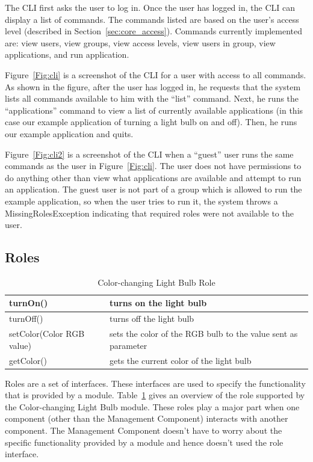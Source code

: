 The CLI first asks the user to log in. Once the user has logged in, the CLI can
display a list of commands. The commands listed are based on the user's access
level (described in Section~\ref{sec:core_access}). Commands currently
implemented are: view users, view groups, view access levels, view users in
group, view applications, and run application.

Figure~\ref{Fig:cli} is a screenshot of the CLI for a user with access to all
commands. As shown in the figure, after the user has logged in, he requests that
the system lists all commands available to him with the ``list'' command. Next,
he runs the ``applications'' command to view a list of currently available
applications (in this case our example application of turning a light bulb on
and off). Then, he runs our example application and quits.

Figure~\ref{Fig:cli2} is a screenshot of the CLI when a ``guest'' user runs the
same commands as the user in Figure~\ref{Fig:cli}. The user does not have
permissions to do anything other than view what applications are available and
attempt to run an application. The guest user is not part of a group which is
allowed to run the example application, so when the user tries to run it, the
system throws a MissingRolesException indicating that required roles were not
available to the user.
\subsection{Roles}
\label{sec:rolesimpl}
\begin{table}
\begin{center}
\begin{tabular}{| p{2.5cm} | p{4.5cm} |}
\hline
turnOn() & turns on the light bulb\\ \hline
turnOff() & turns off the light bulb\\ \hline
setColor(Color RGB value) & sets the color of the RGB bulb to the value sent as
parameter \\ \hline
getColor() & gets the current color of the light bulb \\ \hline
\end{tabular}
\end{center}
\caption{Color-changing Light Bulb Role}
\label{tab:rolestable}
\end{table}
Roles are a set of interfaces. These interfaces are used to specify the
functionality that is provided by a module. Table~\ref{tab:rolestable} gives an
overview of the role supported by the Color-changing Light Bulb module. These
roles play a major part when one component (other than the Management
Component) interacts with another component. The Management Component doesn't
have to worry about the specific functionality provided by a module and hence
doesn't used the role interface.
